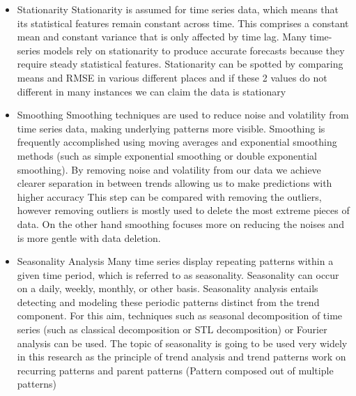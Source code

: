 \documentclass{imc-inf}
\begin{document}
	\begin{itemize}
		\item Stationarity
		Stationarity \cite{Smoothing_and_stationarity} is assumed for time series data, which means that its statistical features remain constant across time.
		This comprises a constant mean and constant variance that is only affected by time lag.
		Many time-series models rely on stationarity to produce accurate forecasts because they require steady statistical features.
		Stationarity can be spotted by comparing means and RMSE in various different places and if these 2 values do not different in many
		instances we can claim the data is stationary
		\item Smoothing
		Smoothing techniques are used to reduce noise and volatility from time series data, making underlying patterns more visible. 
		Smoothing is frequently accomplished using moving averages and exponential smoothing methods
		(such as simple exponential smoothing or double exponential smoothing). By removing noise and volatility from our data we achieve
		clearer separation in between trends allowing us to make predictions with higher accuracy This step can be compared with removing the outliers,
		however removing outliers is mostly used to delete the most extreme pieces of data. On the other hand smoothing focuses more on reducing the noises
		and is more gentle with data deletion.
		\item Seasonality Analysis
		Many time series display repeating patterns within a given time period, which is referred to as seasonality. Seasonality can occur on a daily, weekly, monthly, or other basis.
		Seasonality analysis entails detecting and modeling these periodic patterns distinct from the trend component.
		For this aim, techniques such as seasonal decomposition of time series (such as classical decomposition or STL decomposition) or Fourier analysis can be used.
		The topic of seasonality is going to be used very widely in this research as the principle of trend analysis and trend patterns work on recurring patterns and parent patterns
		(Pattern composed out of multiple patterns)
		
	\end{itemize}
\end{document}
